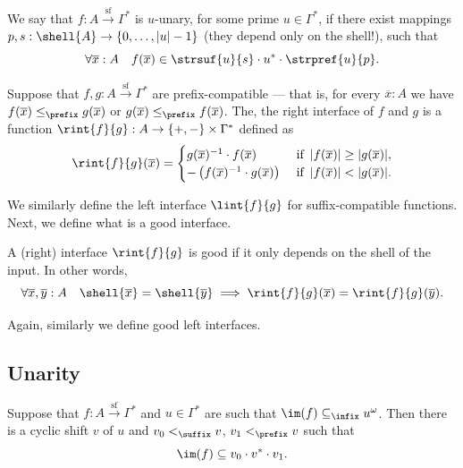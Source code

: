 \begin{definition}
    We say that $f : A \xrightarrow{\mathrm{sf}} \Gamma^*$ is $u$-unary, for some prime $u \in \Gamma^*$, if there exist mappings $p,s : \shell{A} \to \{0, \dots, |u|-1 \}$ (they depend only on the shell!), such that
    \[
        \forall \overline x : A \quad f(\overline x) \in \strsuf{u}{s} \cdot u^* \cdot \strpref{u}{p}.
    \]
\end{definition}

\begin{definition}
    Suppose that $f, g : A \xrightarrow{\mathrm{sf}} \Gamma^*$ are prefix-compatible --- that is, for every $\overline x : A$ we have $f(\overline x) \leq_\prefix g(\overline x)$ or $g(\overline x) \leq_\prefix f(\overline x)$. The, the right interface of $f$ and $g$ is a function $\rint{f}{g} : A \to \{+, -\} \times \Gamma^*$ defined as 
    \[
        \rint{f}{g}(\overline x) = \begin{cases}
            g(\overline x)^{-1} \cdot f(\overline x) & \text{ if } \, |f(\overline x)| \geq |g(\overline x)|, \\ 
            -  \left(f(\overline x)^{-1} \cdot g(\overline x)\right) & \text{ if } \, |f(\overline x)| < |g(\overline x)| .
        \end{cases}
    \]
\end{definition}

We similarly define the left interface $\lint{f}{g}$ for suffix-compatible functions. Next, we define what is a good interface.

\begin{definition}
    A (right) interface $\rint{f}{g}$ is good if it only depends on the shell of the input. In other words,
    \[
        \forall \overline x, \overline y : A \quad \shell{\overline x} = \shell{\overline y} \implies \rint{f}{g}(\overline x) = \rint{f}{g}(\overline y).
    \]
\end{definition}

Again, similarly we define good left interfaces.

\subsection{Unarity}

\begin{lemma}\label{lem:weak-unarity-implies-strong-unarity}
    Suppose that $f : A \xrightarrow{\mathrm{sf}} \Gamma^*$ and $u \in \Gamma^*$ are such that $\im(f) \subseteq_{\infix} u^\omega$. Then there is a cyclic shift $v$ of $u$ and $v_0 <_\suffix v$, $v_1 <_\prefix v$ such that
    \[
        \im(f) \subseteq v_0 \cdot v^* \cdot v_1.
    \]
\end{lemma}

